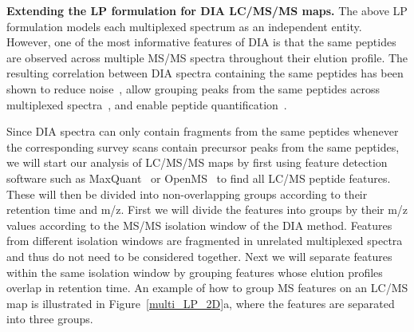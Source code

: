 \documentclass[arial,11pt]{article}
\begin{document}

{\bf Extending the LP formulation for DIA LC/MS/MS maps.}
The above LP formulation models each multiplexed spectrum as an independent entity.  However, one of the most informative features of DIA is that the same peptides are observed across multiple MS/MS spectra throughout their elution profile.  The resulting correlation between DIA spectra containing the same peptides has been shown to reduce noise~\cite{blackburn2010}, allow grouping peaks from the same peptides across multiplexed spectra~\cite{blackburn2010,bern2009}, and enable peptide quantification~\cite{Gillet12targeted}.

Since DIA spectra can only contain fragments from the same peptides whenever the corresponding survey scans contain precursor peaks from the same peptides, we will start our analysis of LC/MS/MS maps by first using feature detection software such as MaxQuant~\cite{cox2008maxquant} or OpenMS~\cite{sturm2008openms} to find all LC/MS peptide features.  These will then be divided into non-overlapping groups according to their retention time and m/z.  First we will divide the features into groups by their m/z values according to the MS/MS isolation window of the DIA method.  Features from different isolation windows are fragmented in unrelated multiplexed spectra and thus do not need to be considered together.  Next we will separate features within the same isolation window by grouping features whose elution profiles overlap in retention time.  An example of how to group MS features on an LC/MS map is illustrated in Figure~\ref{multi_LP_2D}a, where the features are separated into three groups.
\end{document}
